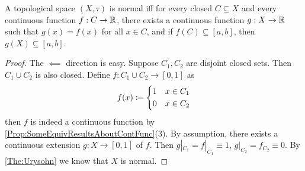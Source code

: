 \documentclass[screen]{techreport}
\numberwithin{equation}{section}
\begin{document}
\begin{theorem}\label{The:TietzeExtension}
	A topological space $(X,\tau)$ is normal iff for every closed $C \subseteq X$ and every continuous function $f: C \to \mathbb{R}$, there exists a continuous function $g: X \to \mathbb{R}$ such that $g(x) = f(x)$ for all $x \in C$, and if $f(C) \subseteq [a,b]$, then $g(X) \subseteq [a,b]$.
\end{theorem}
\begin{proof}
	The $\impliedby$ direction is easy.
	Suppose $C_1,C_2$ are disjoint closed sets.
	Then $C_1 \cup C_2$ is also closed.
	Define $f : C_1 \cup C_2 \to [0,1]$ as
	\[
	f(x) \coloneqq \begin{dcases}
 		1 & x \in C_1 \\
 		0 & x \in C_2	
 	\end{dcases}
	\]
	then $f$ is indeed a continuous function by \cref{Prop:SomeEquivResultsAboutContFunc}(3).
	By assumption, there exists a continuous extension $g : X \to [0,1]$ of $f$.
	Then $g|_{C_1} = f|_{C_1} \equiv 1$, $g|_{C_2} = f_{C_2} \equiv 0$.
	By \cref{The:Urysohn} we know that $X$ is normal.
	

\end{proof}
\end{document}
